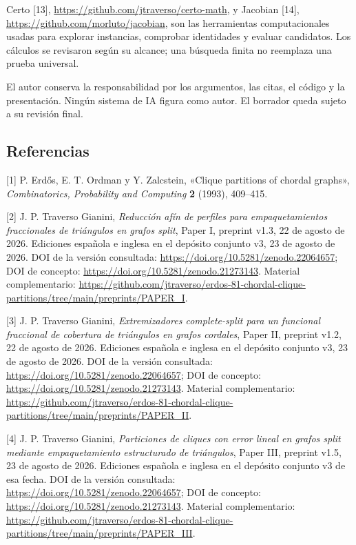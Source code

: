 \documentclass[spanish,11pt,a4paper]{article}
\begin{document}
Certo {[}13{]}, \url{https://github.com/jtraverso/certo-math}, y Jacobian {[}14{]}, \url{https://github.com/morluto/jacobian}, son las herramientas computacionales usadas para explorar instancias, comprobar identidades y evaluar candidatos. Los cálculos se revisaron según su alcance; una búsqueda finita no reemplaza una prueba universal.

El autor conserva la responsabilidad por los argumentos, las citas, el código y la presentación. Ningún sistema de IA figura como autor. El borrador queda sujeto a su revisión final.

\clearpage
\subsection{Referencias}
\begingroup\small\setlength{\parskip}{4pt}\label{referencias}

{[}1{]} P. Erdős, E. T. Ordman y Y. Zalcstein, «Clique partitions of chordal graphs», \emph{Combinatorics, Probability and Computing} \textbf{2} (1993), 409--415.

{[}2{]} J. P. Traverso Gianini, \emph{Reducción afín de perfiles para empaquetamientos fraccionales de triángulos en grafos split}, Paper I, preprint v1.3, 22 de agosto de 2026. Ediciones española e inglesa en el depósito conjunto v3, 23 de agosto de 2026. DOI de la versión consultada: \url{https://doi.org/10.5281/zenodo.22064657}; DOI de concepto: \url{https://doi.org/10.5281/zenodo.21273143}. Material complementario: \url{https://github.com/jtraverso/erdos-81-chordal-clique-partitions/tree/main/preprints/PAPER_I}.

{[}3{]} J. P. Traverso Gianini, \emph{Extremizadores complete-split para un funcional fraccional de cobertura de triángulos en grafos cordales}, Paper II, preprint v1.2, 22 de agosto de 2026. Ediciones española e inglesa en el depósito conjunto v3, 23 de agosto de 2026. DOI de la versión consultada: \url{https://doi.org/10.5281/zenodo.22064657}; DOI de concepto: \url{https://doi.org/10.5281/zenodo.21273143}. Material complementario: \url{https://github.com/jtraverso/erdos-81-chordal-clique-partitions/tree/main/preprints/PAPER_II}.

{[}4{]} J. P. Traverso Gianini, \emph{Particiones de cliques con error lineal en grafos split mediante empaquetamiento estructurado de triángulos}, Paper III, preprint v1.5, 23 de agosto de 2026. Ediciones española e inglesa en el depósito conjunto v3 de esa fecha. DOI de la versión consultada: \url{https://doi.org/10.5281/zenodo.22064657}; DOI de concepto: \url{https://doi.org/10.5281/zenodo.21273143}. Material complementario: \url{https://github.com/jtraverso/erdos-81-chordal-clique-partitions/tree/main/preprints/PAPER_III}.
\end{document}
